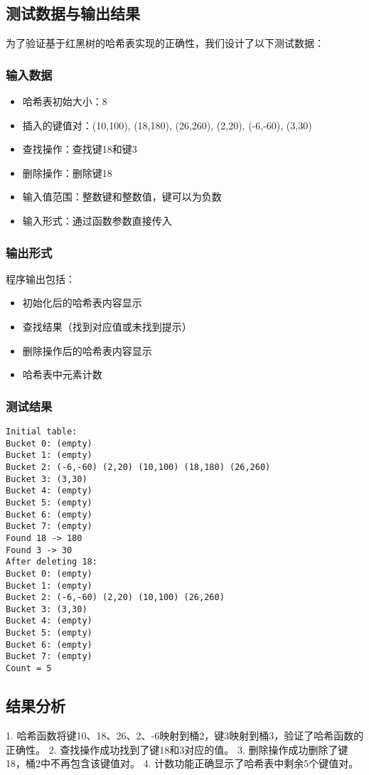 \documentclass[12pt,a4paper]{article}
\begin{document}
\subsection{测试数据与输出结果}
为了验证基于红黑树的哈希表实现的正确性，我们设计了以下测试数据：

\subsubsection{输入数据}
\begin{itemize}
\item 哈希表初始大小：8
\item 插入的键值对：(10,100), (18,180), (26,260), (2,20), (-6,-60), (3,30)
\item 查找操作：查找键18和键3
\item 删除操作：删除键18
\item 输入值范围：整数键和整数值，键可以为负数
\item 输入形式：通过函数参数直接传入
\end{itemize}

\subsubsection{输出形式}
程序输出包括：
\begin{itemize}
\item 初始化后的哈希表内容显示
\item 查找结果（找到对应值或未找到提示）
\item 删除操作后的哈希表内容显示
\item 哈希表中元素计数
\end{itemize}

\subsubsection{测试结果}
\begin{verbatim}
Initial table:
Bucket 0: (empty)
Bucket 1: (empty)
Bucket 2: (-6,-60) (2,20) (10,100) (18,180) (26,260) 
Bucket 3: (3,30) 
Bucket 4: (empty)
Bucket 5: (empty)
Bucket 6: (empty)
Bucket 7: (empty)
Found 18 -> 180
Found 3 -> 30
After deleting 18:
Bucket 0: (empty)
Bucket 1: (empty)
Bucket 2: (-6,-60) (2,20) (10,100) (26,260) 
Bucket 3: (3,30) 
Bucket 4: (empty)
Bucket 5: (empty)
Bucket 6: (empty)
Bucket 7: (empty)
Count = 5
\end{verbatim}

\subsection{结果分析}
1. 哈希函数将键10、18、26、2、-6映射到桶2，键3映射到桶3，验证了哈希函数的正确性。
2. 查找操作成功找到了键18和3对应的值。
3. 删除操作成功删除了键18，桶2中不再包含该键值对。
4. 计数功能正确显示了哈希表中剩余5个键值对。
\end{document}
